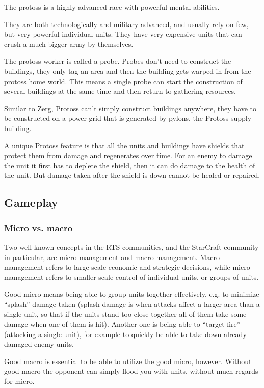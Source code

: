 The protoss is a highly advanced race with powerful mental abilities.

They are both technologically and military advanced, and usually rely on few, but very powerful individual units. They have very expensive units that can crush a much bigger army by themselves.

The protoss worker is called a probe. Probes don't need to construct the buildings, they only tag an area and then the building gets warped in from the protoss home world. This means a single probe can start the construction of several buildings at the same time and then return to gathering resources.

Similar to Zerg, Protoss can't simply construct buildings anywhere, they have to be constructed on a power grid that is generated by pylons, the Protoss supply building.

A unique Protoss feature is that all the units and buildings have shields that protect them from damage and regenerates over time. For an enemy to damage the unit it first has to deplete the shield, then it can do damage to the health of the unit. But damage taken after the shield is down cannot be healed or repaired.

\subsection{Gameplay}
\subsubsection{Micro vs. macro}
Two well-known concepts in the RTS communities, and the StarCraft community in particular, are micro management and macro management. Macro management refers to large-scale economic and strategic decisions, while micro management refers to smaller-scale control of individual units, or groups of units.

Good micro means being able to group units together effectively, e.g. to minimize ``splash'' damage taken (splash damage is when attacks affect a larger area than a single unit, so that if the units stand too close together all of them take some damage when one of them is hit). Another one is being able to ``target fire'' (attacking a single unit), for example to quickly be able to take down already damaged enemy units.

Good macro is essential to be able to utilize the good micro, however. Without good macro the opponent can simply flood you with units, without much regards for micro.

